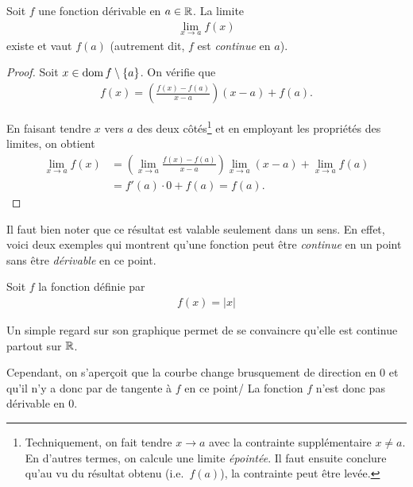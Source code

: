 \documentclass[main.tex]{subfiles}
\begin{document}
\begin{proposition}

    Soit $f$ une fonction dérivable en $a \in \mathbb{R}$.
    La limite
    \begin{align}
        \lim_{x \to a} f(x)
    \end{align}
    existe et vaut $f(a)$
    (autrement dit, $f$ est \emph{continue} en $a$).
\end{proposition}
\begin{proof}
    Soit $x \in \operatorname{dom} f \setminus \{a\}$.
    On vérifie que
    \begin{align}
        f(x) = \left(\frac {f(x) - f(a)} {x - a}\right) (x - a) + f(a).
    \end{align}

    En faisant tendre $x$ vers $a$ des deux côtés\footnote{%
        Techniquement, on fait tendre $x \to a$ avec la contrainte supplémentaire $x \neq a$.
        En d'autres termes, on calcule une limite \emph{épointée}.
        Il faut ensuite conclure qu'au vu du résultat obtenu (i.e.\ $f(a)$),
        la contrainte peut être levée.
    }
    et en employant les propriétés des limites,
    on obtient
    \begin{align}
        \lim_{x \to a} f(x)
        &= \left(\lim_{x \to a} \frac {f(x) - f(a)} {x - a}\right) \lim_{x \to a} (x - a) + \lim_{x \to a} f(a)\\
        &= f'(a) \cdot 0 + f(a) = f(a).
    \end{align}
\end{proof}

Il faut bien noter que ce résultat est valable seulement dans un sens.
En effet, voici deux exemples qui montrent qu'une fonction peut être \emph{continue} en un point sans être \emph{dérivable} en ce point.

\begin{example}
    
    Soit $f$ la fonction définie par 
    \begin{align}
        f(x) = |x|
    \end{align}
    
    Un simple regard sur son graphique permet de se convaincre qu'elle est continue partout sur $\mathbb{R}$.
    \begin{plot}{0.5}{-4}{-1}{4}{4}
    \end{plot}
    
    Cependant, on s'aperçoit que la courbe change brusquement de direction en $0$ et qu'il n'y a donc par de tangente à $f$ en ce point/
    La fonction $f$ n'est donc pas dérivable en $0$.
\end{example}
\end{document}
